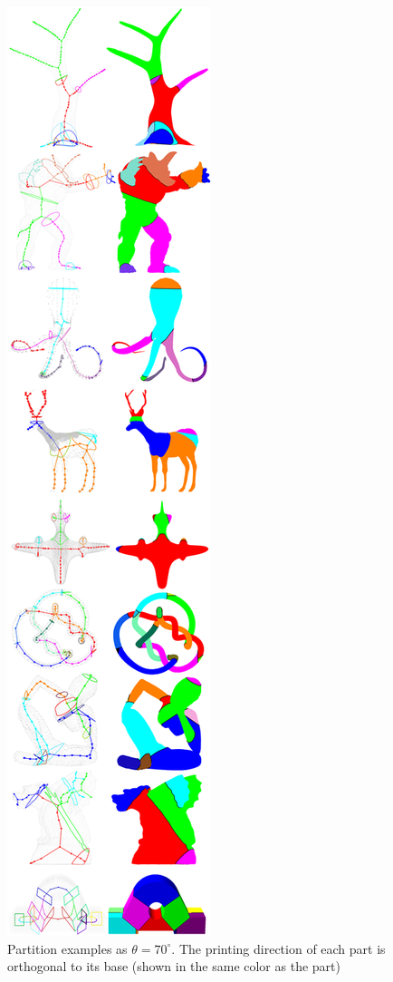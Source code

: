 \begin{figure}[t]
  \centering
  \includegraphics[width=0.6\linewidth]{figs/programming.png}
  \caption{\label{fig:programming}%
           Partition examples as $\theta = 70^{\circ}$. The printing direction of each part is orthogonal to its base (shown in the same color as the part)}
\end{figure}

